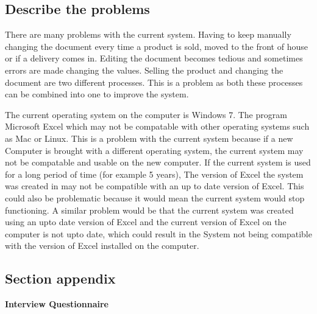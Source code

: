 \subsection{Describe the problems}

	\begin{flushleft}
There are many problems with the current system. Having to keep manually changing the document every time a product is sold, moved to the front of house or if a delivery comes in. Editing the document becomes tedious and sometimes errors are made changing the values. Selling the product and changing the document are two different processes. This is a problem as both these processes can be combined into one to improve the system. \par

The current operating system on the computer is Windows 7. The program Microsoft Excel which may not be compatable with other operating systems such as Mac or Linux. This is a problem with the current system because if a new Computer is brought with a different operating system, the current system may not be compatable and usable on the new computer. If the current system is used for a long period of time (for example 5 years), The version of Excel the system was created in may not be compatible with an up to date version of Excel. This could also be problematic because it would mean the current system would stop functioning. A similar problem would be that the current system was created using an upto date version of Excel and the current version of Excel on the computer is not upto date, which could result in the System not being compatible with the version of Excel installed on the computer. \par

	\end{flushleft}


\subsection{Section appendix}

	\begin{center}

\textbf{Interview Questionnaire}

	\end{center}

